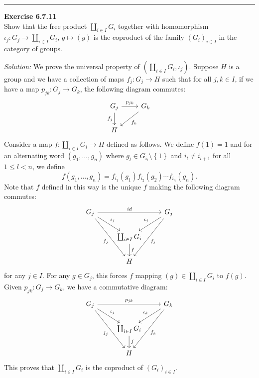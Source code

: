 \documentclass[a4paper, 12pt]{article}
\newenvironment{problem}[2][Exercise]
    { \begin{mdframed}[backgroundcolor=gray!20] \textbf{#1 #2} \\}
    {  \end{mdframed}}
\newenvironment{solution}
    {\textit{Solution:}}
    {}
\begin{document}
\noindent\rule{7in}{2.8pt}
\begin{problem}{6.7.11}
Show that the free product \(\coprod_{i\in I}G_i\) together with homomorphism \(\iota_j:G_j\rightarrow \coprod_{i\in I}G_i\), \(g\mapsto (g)\) is the coproduct of the family 
\((G_i)_{i\in I}\) in the category of groups.
\end{problem}
\begin{solution}
We prove the universal property of \((\coprod_{i\in I}G_i,\iota_j)\). Suppose \(H\) is a group and we have a collection of maps \(f_j:G_j\rightarrow H\) such that for all \(j,k\in I\), if we have a map \(p_{jk}:G_j\rightarrow G_k\), the following diagram 
commutes:
\[\begin{tikzcd}
	{G_j} & {G_k} \\
	H
	\arrow["{p_{jk}}", from=1-1, to=1-2]
	\arrow["{f_j}"', from=1-1, to=2-1]
	\arrow["{f_k}", from=1-2, to=2-1]
\end{tikzcd}\]
Consider a map \(f:\coprod_{i\in I}G_i\rightarrow H\) defined as follows. We define \(f(1)=1\) and for an alternating word \((g_1,\ldots,g_n)\) where \(g_l\in G_{i_l}\setminus \left\{ 1 \right\}\) and \(i_l\neq i_{l+1}\) for all 
\(1\leq l<n\), we define 
\[f(g_1,\ldots,g_n)=f_{i_1}(g_1)f_{i_2}(g_2)\cdots f_{i_n}(g_n).\] 
Note that \(f\) defined in this way is the unique \(f\) making the following diagram commutes:
\[\begin{tikzcd}
	{G_j} && {G_j} \\
	& {\coprod_{i\in I}G_i} \\
	& H
	\arrow["id", from=1-1, to=1-3]
	\arrow["{\iota_j}", from=1-1, to=2-2]
	\arrow["{f_j}"', from=1-1, to=3-2]
	\arrow["{\iota_j}"', from=1-3, to=2-2]
	\arrow["{f_j}", from=1-3, to=3-2]
	\arrow["f", from=2-2, to=3-2]
\end{tikzcd}\]
for any \(j\in I\). For any \(g\in G_j\), this forces \(f\) mapping \((g)\in \coprod_{i\in I}G_i\) to \(f(g)\). Given \(p_{jk}:G_j\rightarrow G_k\), we have a commutative diagram:
\[\begin{tikzcd}
	{G_j} && {G_k} \\
	& {\coprod_{i\in I}G_i} \\
	& H
	\arrow["{p_{jk}}", from=1-1, to=1-3]
	\arrow["{\iota_j}", from=1-1, to=2-2]
	\arrow["{f_j}"', from=1-1, to=3-2]
	\arrow["{\iota_k}"', from=1-3, to=2-2]
	\arrow["{f_k}", from=1-3, to=3-2]
	\arrow["f", from=2-2, to=3-2]
\end{tikzcd}\]
This proves that \(\coprod_{i\in I}G_i\) is the coproduct of \((G_i)_{i\in I}\).
\end{solution}
\end{document}
